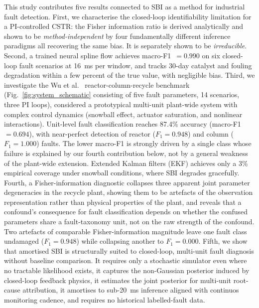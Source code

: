 \documentclass[aps,pre,twocolumn,superscriptaddress]{revtex4-2}
\begin{document}
This study contributes five results connected to SBI as a method for industrial fault detection. First, we characterise the closed-loop identifiability limitation for a PI-controlled CSTR: the Fisher information ratio is derived analytically and shown to be \emph{method-independent} by four fundamentally
different inference paradigms all recovering the same
bias. It is separately shown to be \emph{irreducible}.
Second, a trained neural spline flow achieves macro-F1~$= 0.990$ on six closed-loop fault scenarios at 16~ms per window, and tracks 30-day catalyst and fouling degradation within a few percent of the true value, with negligible bias.
Third, we investigate the Wu et al.~\citeyearpar{Wu2003} reactor-column-recycle benchmark
(Fig.~\ref{fig:system_schematic} consisting of five fault parameters, 14 scenarios, three PI loops),
considered a prototypical multi-unit plant-wide system with complex control
dynamics (snowball effect, actuator saturation, and nonlinear interactions).
Unit-level fault classification reaches 87.4\% accuracy (macro-F1~$=0.694$),
with near-perfect detection of reactor ($F_1=0.948$) and column ($F_1=1.000$)
faults. The lower macro-F1 is strongly driven by a single class whose
failure is explained by our fourth contribution below, not by a
general weakness of the plant-wide extension. Extended Kalman filters (EKF) 
achieves only a 3\% empirical coverage under snowball conditions, where SBI degrades gracefully.
Fourth, a Fisher-information diagnostic collapses three apparent joint parameter degeneracies in the recycle plant, showing them
to be artefacts of the observation representation rather than physical
properties of the plant, and reveals that a confound's consequence for fault
classification depends on whether the confused parameters share a
fault-taxonomy unit, not on the raw strength of the confound. Two artefacts
of comparable Fisher-information magnitude leave one fault class undamaged
($F_1=0.948$) while collapsing another to $F_1=0.000$. 
Fifth, we show that amortised SBI is structurally suited to closed-loop, multi-unit fault diagnosis without baseline comparison. It
requires only a stochastic simulator even where no tractable likelihood exists, it
captures the non-Gaussian posterior induced by closed-loop feedback physics, it estimates the joint posterior for multi-unit root-cause attribution, it amortises
to sub-20~ms inference aligned with continuos monitoring cadence, and requires no historical labelled-fault data.
\end{document}
